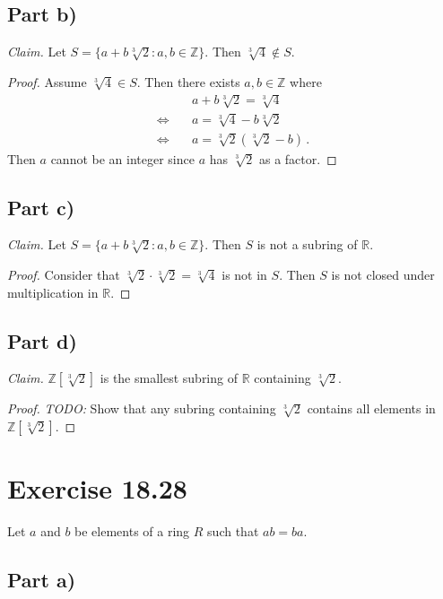 \documentclass{abrice}
\newcommand{\Z}{\mathbb{Z}}
\newcommand{\R}{\mathbb{R}}
\begin{document}
\subsection{Part b)}

\emph{Claim.} Let $S = \{ a + b \sqrt[3]{2} : a,b \in \Z \}$. Then $\sqrt[3]{4}
\notin S$.

\begin{proof}
  Assume $\sqrt[3]{4} \in S$. Then there exists $a,b \in \Z$ where
  \begin{align*}
    &a + b \sqrt[3]{2} = \sqrt[3]{4} \\
    \Longleftrightarrow \quad
    &a = \sqrt[3]{4} - b \sqrt[3]{2} \\
    \Longleftrightarrow \quad
    &a = \sqrt[3]{2} (\sqrt[3]{2} - b)\, .
  \end{align*}
  Then $a$ cannot be an integer since $a$ has $\sqrt[3]{2}$ as a factor.
\end{proof}

\subsection{Part c)}

\emph{Claim.} Let $S = \{a + b\sqrt[3]{2} : a,b \in \Z \}$. Then $S$ is not a
subring of $\R$.

\begin{proof}
  Consider that $\sqrt[3]{2} \cdot \sqrt[3]{2} = \sqrt[3]{4}$ is not in $S$.
  Then $S$ is not closed under multiplication in $\R$.
\end{proof}

\subsection{Part d)}

\emph{Claim.} $\Z[\sqrt[3]{2}]$ is the smallest subring of $\R$ containing
$\sqrt[3]{2}$.

\begin{proof}
  \emph{TODO:} Show that any subring containing $\sqrt[3]{2}$ contains all
  elements in $\Z[\sqrt[3]{2}]$.
\end{proof}

\section{Exercise 18.28}

Let $a$ and $b$ be elements of a ring $R$ such that $ab = ba$.

\subsection{Part a)}
\end{document}

